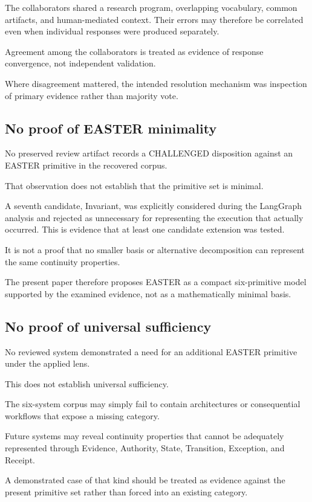 \documentclass[11pt]{article}
\begin{document}
The collaborators shared a research program, overlapping vocabulary, common artifacts, and human-mediated context. Their errors may therefore be correlated even when individual responses were produced separately.

Agreement among the collaborators is treated as evidence of response convergence, not independent validation.

Where disagreement mattered, the intended resolution mechanism was inspection of primary evidence rather than majority vote.

\subsection{No proof of EASTER minimality}

No preserved review artifact records a CHALLENGED disposition against an EASTER primitive in the recovered corpus.

That observation does not establish that the primitive set is minimal.

A seventh candidate, Invariant, was explicitly considered during the LangGraph analysis and rejected as unnecessary for representing the execution that actually occurred. This is evidence that at least one candidate extension was tested.

It is not a proof that no smaller basis or alternative decomposition can represent the same continuity properties.

The present paper therefore proposes EASTER as a compact six-primitive model supported by the examined evidence, not as a mathematically minimal basis.

\subsection{No proof of universal sufficiency}

No reviewed system demonstrated a need for an additional EASTER primitive under the applied lens.

This does not establish universal sufficiency.

The six-system corpus may simply fail to contain architectures or consequential workflows that expose a missing category.

Future systems may reveal continuity properties that cannot be adequately represented through Evidence, Authority, State, Transition, Exception, and Receipt.

A demonstrated case of that kind should be treated as evidence against the present primitive set rather than forced into an existing category.
\end{document}
